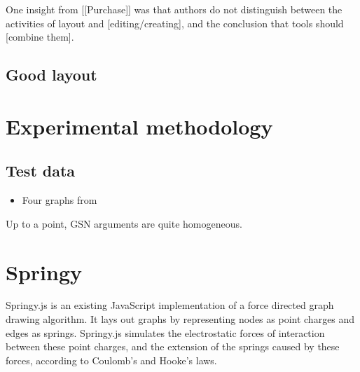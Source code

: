 One insight from [[Purchase]] was that authors do not distinguish between the activities of layout and [editing/creating], and the conclusion that tools should [combine them]. 

\subsection{Good layout}




\section{Experimental methodology}


\subsection{Test data}

\begin{itemize}
    \item Four graphs from \citet{aldenthesis}
\end{itemize}

Up to a point, GSN arguments are quite homogeneous. 


\section{Springy}

Springy.js is an existing JavaScript implementation of a force directed graph drawing algorithm.
It lays out graphs by representing nodes as point charges and edges as springs. Springy.js simulates the electrostatic forces of interaction between these point charges, and the extension of the springs caused by these forces, according to Coulomb's and Hooke's laws.



